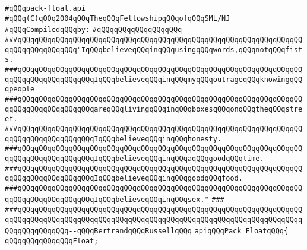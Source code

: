 \label{src/lib/std/src/pack-float.api}
\verb|#qQQqpack-float.api|\newline
\verb|#qQQq(C)qQQq2004qQQqTheqQQqFellowshipqQQqofqQQqSML/NJ|\newline
\newline
\verb|#qQQqCompiledqQQqby:|\newline
\verb|#qQQqqQQqqQQqqQQqqQQq|\newline
\newline
\newline
\newline
\verb|###qQQqqQQqqQQqqQQqqQQqqQQqqQQqqQQqqQQqqQQqqQQqqQQqqQQqqQQqqQQqqQQqqQQqqQQqqQQqqQQqqQQq"IqQQqbelieveqQQqinqQQqusingqQQqwords,qQQqnotqQQqfists.|\newline
\verb|###qQQqqQQqqQQqqQQqqQQqqQQqqQQqqQQqqQQqqQQqqQQqqQQqqQQqqQQqqQQqqQQqqQQqqQQqqQQqqQQqqQQqqQQqIqQQqbelieveqQQqinqQQqmyqQQqoutrageqQQqknowingqQQqpeople|\newline
\verb|###qQQqqQQqqQQqqQQqqQQqqQQqqQQqqQQqqQQqqQQqqQQqqQQqqQQqqQQqqQQqqQQqqQQqqQQqqQQqqQQqqQQqqQQqareqQQqlivingqQQqinqQQqboxesqQQqonqQQqtheqQQqstreet.|\newline
\verb|###qQQqqQQqqQQqqQQqqQQqqQQqqQQqqQQqqQQqqQQqqQQqqQQqqQQqqQQqqQQqqQQqqQQqqQQqqQQqqQQqqQQqqQQqIqQQqbelieveqQQqinqQQqhonesty.|\newline
\verb|###qQQqqQQqqQQqqQQqqQQqqQQqqQQqqQQqqQQqqQQqqQQqqQQqqQQqqQQqqQQqqQQqqQQqqQQqqQQqqQQqqQQqqQQqIqQQqbelieveqQQqinqQQqaqQQqgoodqQQqtime.|\newline
\verb|###qQQqqQQqqQQqqQQqqQQqqQQqqQQqqQQqqQQqqQQqqQQqqQQqqQQqqQQqqQQqqQQqqQQqqQQqqQQqqQQqqQQqqQQqIqQQqbelieveqQQqinqQQqgoodqQQqfood.|\newline
\verb|###qQQqqQQqqQQqqQQqqQQqqQQqqQQqqQQqqQQqqQQqqQQqqQQqqQQqqQQqqQQqqQQqqQQqqQQqqQQqqQQqqQQqqQQqIqQQqbelieveqQQqinqQQqsex."|\newline
\verb|###|\newline
\verb|###qQQqqQQqqQQqqQQqqQQqqQQqqQQqqQQqqQQqqQQqqQQqqQQqqQQqqQQqqQQqqQQqqQQqqQQqqQQqqQQqqQQqqQQqqQQqqQQqqQQqqQQqqQQqqQQqqQQqqQQqqQQqqQQqqQQqqQQqqQQqqQQqqQQqqQQq--qQQqBertrandqQQqRussellqQQq|\newline
\newline
\newline
\newline
\verb|apiqQQqPack_FloatqQQq{|\newline
\newline
\verb|qQQqqQQqqQQqqQQqFloat;|\newline
